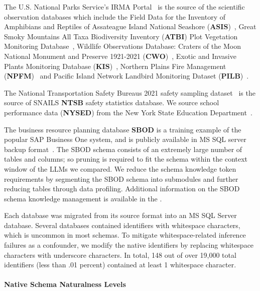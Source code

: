 The U.S. National Parks Service's IRMA Portal~\cite{nps-irma-portal} is the source of the scientific observation databases which include the 
Field Data for the Inventory of Amphibians and Reptiles of Assateague Island National Seashore (\textbf{ASIS})~\cite{assateague-herp}, 
Great Smoky Mountains All Taxa Biodiversity Inventory (\textbf{ATBI}) Plot Vegetation Monitoring Database~\cite{gsmnp-atbi}, 
Wildlife Observations Database: Craters of the Moon National Monument and Preserve 1921-2021 (\textbf{CWO})~\cite{craters-of-the-moon-wildlife}, 
Exotic and Invasive Plants Monitoring Database (\textbf{KIS})~\cite{klamath-inventory}, 
Northern Plains Fire Management (\textbf{NPFM})~\cite{ngp-fire}
and Pacific Island Network Landbird Monitoring Dataset (\textbf{PILB})~\cite{pilb-dataset}. 

The National Transportation Safety Bureaus 2021 safety sampling dataset~\cite{ncsa2022overview, crash-investigation-sampling-system} is the source of SNAILS \textbf{NTSB} safety statistics database. 
We source school performance data (\textbf{NYSED}) from the New York State Education Department~\cite{nysed-report-card}. 

The business resource planning database \textbf{SBOD} is a training example of the popular SAP Business One system, and is publicly available in MS SQL server backup format~\cite{sap-demo}.
The SBOD schema consists of an extremely large number of tables and columns; so pruning is required to fit the schema within the context window of the LLMs we compared.
We reduce the schema knowledge token requirements by segmenting the SBOD schema into submodules and further reducing tables through data profiling.
Additional information on the SBOD schema knowledge management is available in the \fi.

Each database was migrated from its source format into an MS SQL Server database.
Several databases contained identifiers with whitespace characters, which is uncommon in most schemas.
To mitigate whitespace-related inference failures as a confounder, we modify the native identifiers by replacing whitespace characters with underscore characters.
In total, 148 out of over 19,000 total identifiers (less than .01 percent) contained at least 1 whitespace character.

\paragraph{\textbf{Native Schema Naturalness Levels}}

